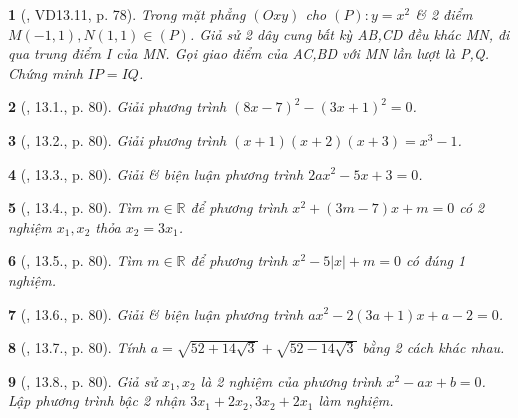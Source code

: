 \documentclass{article}
\newtheorem{baitoan}{}
\begin{document}
\begin{baitoan}[\cite{TLCT_THCS_Toan_9_dai_so}, VD13.11, p. 78]
	Trong mặt phẳng $(Oxy)$ cho $(P):y = x^2$ \& 2 điểm $M(-1,1),N(1,1)\in(P)$. Giả sử 2 dây cung bất kỳ AB,CD đều khác MN, đi qua trung điểm I của MN. Gọi giao điểm của AC,BD với MN lần lượt là P,Q. Chứng minh $IP = IQ$. 
\end{baitoan}

\begin{baitoan}[\cite{TLCT_THCS_Toan_9_dai_so}, 13.1., p. 80]
	Giải phương trình $(8x - 7)^2 - (3x + 1)^2 = 0$.
\end{baitoan}

\begin{baitoan}[\cite{TLCT_THCS_Toan_9_dai_so}, 13.2., p. 80]
	Giải phương trình $(x + 1)(x + 2)(x + 3) = x^3 - 1$.
\end{baitoan}

\begin{baitoan}[\cite{TLCT_THCS_Toan_9_dai_so}, 13.3., p. 80]
	Giải \& biện luận phương trình $2ax^2 - 5x + 3 = 0$.
\end{baitoan}

\begin{baitoan}[\cite{TLCT_THCS_Toan_9_dai_so}, 13.4., p. 80]
	Tìm $m\in\mathbb{R}$ để phương trình $x^2 + (3m - 7)x + m = 0$ có 2 nghiệm $x_1,x_2$ thỏa $x_2 = 3x_1$.
\end{baitoan}

\begin{baitoan}[\cite{TLCT_THCS_Toan_9_dai_so}, 13.5., p. 80]
	Tìm $m\in\mathbb{R}$ để phương trình $x^2 - 5|x| + m = 0$ có đúng 1 nghiệm.
\end{baitoan}

\begin{baitoan}[\cite{TLCT_THCS_Toan_9_dai_so}, 13.6., p. 80]
	Giải \& biện luận phương trình $ax^2 - 2(3a + 1)x + a - 2 = 0$.
\end{baitoan}

\begin{baitoan}[\cite{TLCT_THCS_Toan_9_dai_so}, 13.7., p. 80]
	Tính $a = \sqrt{52 + 14\sqrt{3}} + \sqrt{52 - 14\sqrt{3}}$ bằng 2 cách khác nhau.
\end{baitoan}

\begin{baitoan}[\cite{TLCT_THCS_Toan_9_dai_so}, 13.8., p. 80]
	Giả sử $x_1,x_2$ là 2 nghiệm của phương trình $x^2 - ax + b = 0$. Lập phương trình bậc 2 nhận $3x_1 + 2x_2,3x_2 + 2x_1$ làm nghiệm.
\end{baitoan}
\end{document}
